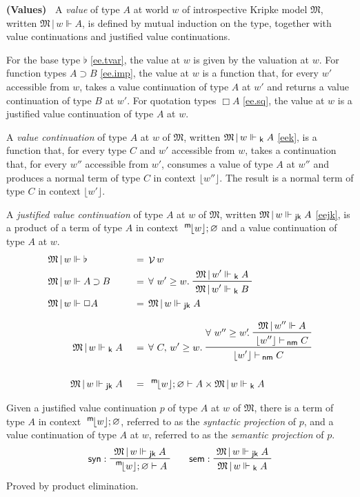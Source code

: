 \documentclass{entcs}
\numberwithin{equation}{thm}
\newcommand{\tsf}[1]{\textsf{\upshape{#1}}}
\newcommand{\stsf}[1]{\smash{\tsf{\small{#1}}}}
\renewcommand{\:}{\mathrel{:}}
\newcommand{\tyrule}[1]{\prftree[l]{${#1} \:\,$}}
\let\oldforall\forall
\renewcommand{\forall}{\oldforall\,}
\newcommand{\0}{\varnothing}
\newcommand{\base}{\flat}
\newcommand{\imp}{\mathbin{\supset}}
\newcommand{\sq}{\Box}
\renewcommand{\e}{\mathrel{\vdash}}
\newcommand{\enm}{\mathrel{\vdash_{\mkern-2mu\stsf{nm}}}}
\newcommand{\M}{\mathfrak{M}}
\newcommand{\Mover}{\M\,|\,}
\newcommand{\V}{\operatorname{\mathcal{V}}}
\newcommand{\peek}[1]{\mathopen{\lfloor}{#1}\mathclose{\rfloor}}
\newcommand{\mpeek}[1]{\mathopen{^{\stsf{m}\mkern-3mu}\lfloor}{#1}\mathclose{\rfloor}}
\newcommand{\ee}{\mathrel{\Vdash}}
\newcommand{\eek}{\mathrel{\Vdash_{\stsf{k}}}}
\newcommand{\eejk}{\mathrel{\Vdash_{\stsf{jk}}}}
\newcommand{\syn}{\operatorname{\tsf{syn}}}
\newcommand{\sem}{\operatorname{\tsf{sem}}}
\begin{document}
\begin{definition}
  \textbf{(Values)\ }
  \label{ee/eek/eejk}
  A \emph{value} of type $A$ at world $w$ of introspective Kripke model $\M$, written $\Mover w \ee A$, is defined by mutual induction on the type, together with value continuations and justified value continuations.
  
  For the base type $\flat$ \eqref{ee.tvar}, the value at $w$ is given by the valuation at $w$.
  For function types $A \imp B$ \eqref{ee.imp}, the value at $w$ is a function that, for every $w'$ accessible from $w$, takes a value continuation of type $A$ at $w'$ and returns a value continuation of type $B$ at $w'$.
  For quotation types $\sq A$ \eqref{ee.sq}, the value at $w$ is a justified value continuation of type $A$ at $w$.
  
  A \emph{value continuation} of type $A$ at $w$ of $\M$, written $\Mover w \eek A$ \eqref{eek}, is a function that, for every type $C$ and $w'$ accessible from $w$, takes a continuation that, for every $w''$ accessible from $w'$, consumes a value of type $A$ at $w''$ and produces a normal term of type $C$ in context $\peek{w''}$.
  The result is a normal term of type $C$ in context $\peek{w'}$.
  
   A \emph{justified value continuation} of type $A$ at $w$ of $\M$, written $\Mover w \eejk A$ \eqref{eejk}, is a product of a term of type $A$ in context $\mpeek{w}; \0$ and a value continuation of type $A$ at $w$.
  \begin{alignat}{3}
    \label{ee.tvar} & \rlap{$\Mover w \ee \base$}    &&\,&&=\, \V w\\
    \label{ee.imp}  & \rlap{$\Mover w \ee A \imp B$} &&\,&&=\, \forall w' \ge w.\ \raisebox{-8pt}{\prftree{\Mover w' \eek A} {\Mover w' \eek B}}\\
    \label{ee.sq}   & \rlap{$\Mover w \ee \sq A$}    &&\,&&=\, \Mover w \eejk A\\[0.5\baselineskip]
    \label{eek}     && \ \quad \Mover w \eek A        &\,&&=\, \forall C,\,w' \ge w.\ \raisebox{-8pt}{\prftree{\raisebox{8pt}{$\forall w'' \ge w'\mkern-4mu.\ $} \prftree{\Mover w'' \ee A}{\lfloor w'' \rfloor \enm C}}{\lfloor w' \rfloor \enm C}}\\[\baselineskip]
    \label{eejk}    && \ \quad \Mover w \eejk A       &\,&&=\, \mpeek{w}; \0 \e A \times \Mover w \eek A
  \end{alignat}
\end{definition}

\begin{lemma}
  \normalshape
  \label{syn/sem}
  Given a justified value continuation $p$ of type $A$ at $w$ of $\M$, there is a term of type $A$ in context $\mpeek{w}; \0$, referred to as the \emph{syntactic projection} of $p$, and a value continuation of type $A$ at $w$, referred to as the \emph{semantic projection} of $p$.
  \begin{gather*}
    \tyrule{\syn}{\Mover w \eejk A}{\mpeek{w}; \0 \e A}\qquad
    \tyrule{\sem}{\Mover w \eejk A}{\Mover w \eek A}
  \end{gather*}
  Proved by product elimination.
\end{lemma}
\end{document}
